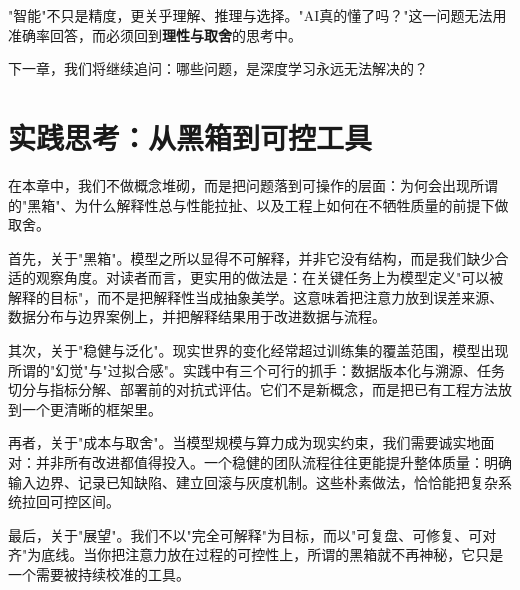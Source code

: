 "智能"不只是精度，更关乎理解、推理与选择。"AI真的懂了吗？"这一问题无法用准确率回答，而必须回到\textbf{理性与取舍}的思考中。

下一章，我们将继续追问：哪些问题，是深度学习永远无法解决的？

\section*{实践思考：从黑箱到可控工具}

在本章中，我们不做概念堆砌，而是把问题落到可操作的层面：为何会出现所谓的"黑箱"、为什么解释性总与性能拉扯、以及工程上如何在不牺牲质量的前提下做取舍。

首先，关于"黑箱"。模型之所以显得不可解释，并非它没有结构，而是我们缺少合适的观察角度。对读者而言，更实用的做法是：在关键任务上为模型定义"可以被解释的目标"，而不是把解释性当成抽象美学。这意味着把注意力放到误差来源、数据分布与边界案例上，并把解释结果用于改进数据与流程。

其次，关于"稳健与泛化"。现实世界的变化经常超过训练集的覆盖范围，模型出现所谓的"幻觉"与"过拟合感"。实践中有三个可行的抓手：数据版本化与溯源、任务切分与指标分解、部署前的对抗式评估。它们不是新概念，而是把已有工程方法放到一个更清晰的框架里。

再者，关于"成本与取舍"。当模型规模与算力成为现实约束，我们需要诚实地面对：并非所有改进都值得投入。一个稳健的团队流程往往更能提升整体质量：明确输入边界、记录已知缺陷、建立回滚与灰度机制。这些朴素做法，恰恰能把复杂系统拉回可控区间。

最后，关于"展望"。我们不以"完全可解释"为目标，而以"可复盘、可修复、可对齐"为底线。当你把注意力放在过程的可控性上，所谓的黑箱就不再神秘，它只是一个需要被持续校准的工具。

\nocite{*}
\printbibliography[heading=bibintoc, title=\ebibname]
\newpage
